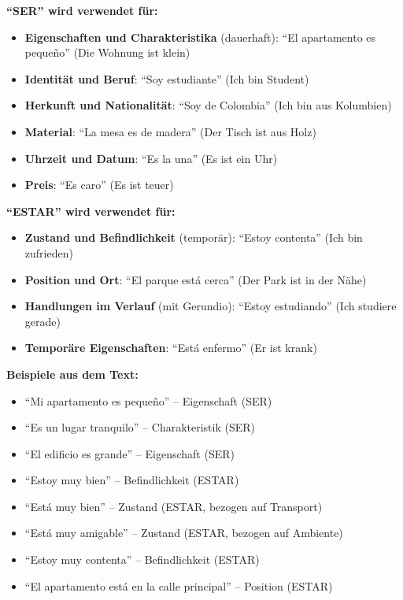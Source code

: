 \documentclass[12pt,a4paper]{article}
\begin{document}
\textbf{\enquote{SER} wird verwendet für:}
\begin{itemize}[leftmargin=*]
    \item \textbf{Eigenschaften und Charakteristika} (dauerhaft): \enquote{El apartamento es pequeño} (Die Wohnung ist klein)
    \item \textbf{Identität und Beruf}: \enquote{Soy estudiante} (Ich bin Student)
    \item \textbf{Herkunft und Nationalität}: \enquote{Soy de Colombia} (Ich bin aus Kolumbien)
    \item \textbf{Material}: \enquote{La mesa es de madera} (Der Tisch ist aus Holz)
    \item \textbf{Uhrzeit und Datum}: \enquote{Es la una} (Es ist ein Uhr)
    \item \textbf{Preis}: \enquote{Es caro} (Es ist teuer)
\end{itemize}

\textbf{\enquote{ESTAR} wird verwendet für:}
\begin{itemize}[leftmargin=*]
    \item \textbf{Zustand und Befindlichkeit} (temporär): \enquote{Estoy contenta} (Ich bin zufrieden)
    \item \textbf{Position und Ort}: \enquote{El parque está cerca} (Der Park ist in der Nähe)
    \item \textbf{Handlungen im Verlauf} (mit Gerundio): \enquote{Estoy estudiando} (Ich studiere gerade)
    \item \textbf{Temporäre Eigenschaften}: \enquote{Está enfermo} (Er ist krank)
\end{itemize}

\textbf{Beispiele aus dem Text:}
\begin{itemize}[leftmargin=*]
    \item \enquote{Mi apartamento es pequeño} -- Eigenschaft (SER)
    \item \enquote{Es un lugar tranquilo} -- Charakteristik (SER)
    \item \enquote{El edificio es grande} -- Eigenschaft (SER)
    \item \enquote{Estoy muy bien} -- Befindlichkeit (ESTAR)
    \item \enquote{Está muy bien} -- Zustand (ESTAR, bezogen auf Transport)
    \item \enquote{Está muy amigable} -- Zustand (ESTAR, bezogen auf Ambiente)
    \item \enquote{Estoy muy contenta} -- Befindlichkeit (ESTAR)
    \item \enquote{El apartamento está en la calle principal} -- Position (ESTAR)
\end{itemize}
\end{document}
